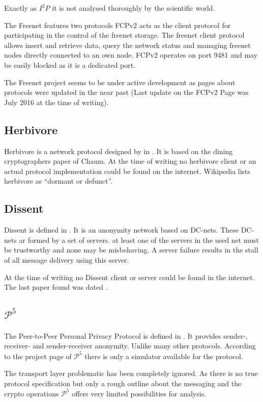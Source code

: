 Exactly as $I^2P$ it is not analysed thoroughly by the scientific world. 

The Freenet features two protocols FCPv2 acts as the client protocol for participating in the control of the freenet storage. The freenet client protocol allows insert and retrieve data, query the network status and managing freenet nodes directly connected to an own node. FCPv2 operates on port 9481 and may be easily blocked as it is a dedicated port. 

The Freenet project seems to be under active development as pages about protocols were updated in the near past (Last update on the FCPv2 Page was July  2016 at the time of writing).

\subsection{Herbivore}
Herbivore is a network protocol designed by \citeauthor{herbivore:tr} in \cite{herbivore:tr}. It is based on the dining cryptographers paper of Chaum. At the time of writing no herbivore client or an actual protocol implementation could be found on the internet. Wikipedia lists herbivore as ``dormant or defunct''.

\subsection{Dissent}
Dissent is defined in \cite{Corrigan-Gibbs:2010:DAA:1866307.1866346}. It is an anonymity network based on DC-nets. These DC-nets ar formed by a set of servers. at least one of the servers in the used net must be trustworthy and none may be misbehaving. A server failure results in the stall of all message delivery using this server.

At the time of writing no Dissent client or server could be found in the internet. The last paper\cite{wolinsky2012dissent} found was dated \citeyear{wolinsky2012dissent}.

\subsection{$\mathcal{P}^5$}
The Peer-to-Peer Personal Privacy Protocol is defined in \cite{sherwood-protocol}. It provides sender-, receiver- and sender-receiver anonymity. Unlike many other protocols. According to the project page of $\mathcal{P}^5$ there is only a simulator available for the protocol.

The transport layer problematic has been completely ignored. As there is no true protocol specification but only a rough outline about the messaging and the crypto operations $\mathcal{P}^5$ offers very limited possibilities for analysis.

